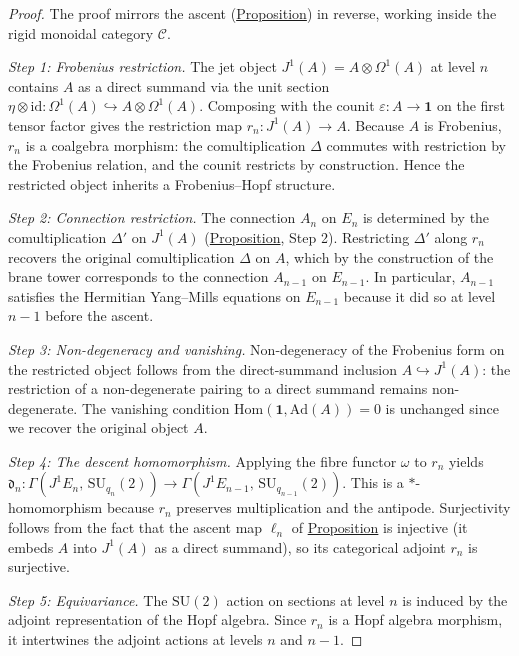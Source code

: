 \begin{proof}
The proof mirrors the ascent (\hyperref[prop:jet-prolongation]{Proposition}) in
reverse, working inside the rigid monoidal category $\mathcal{C}$.

\emph{Step 1: Frobenius restriction.}
The jet object $J^1(A) = A \otimes \Omega^1(A)$ at level $n$ contains $A$
as a direct summand via the unit section
$\eta \otimes \mathrm{id}\colon \Omega^1(A) \hookrightarrow A \otimes
\Omega^1(A)$.  Composing with the counit $\varepsilon\colon A \to \mathbf{1}$
on the first tensor factor gives the restriction map
$r_n\colon J^1(A) \to A$.  Because $A$ is Frobenius, $r_n$ is a coalgebra
morphism: the comultiplication $\Delta$ commutes with restriction by the
Frobenius relation, and the counit restricts by construction.  Hence the
restricted object inherits a Frobenius--Hopf structure.

\emph{Step 2: Connection restriction.}
The connection $A_n$ on $E_n$ is determined by the comultiplication
$\Delta'$ on $J^1(A)$ (\hyperref[prop:jet-prolongation]{Proposition}, Step 2).
Restricting $\Delta'$ along $r_n$ recovers the original comultiplication
$\Delta$ on $A$, which by the construction of the brane tower corresponds to
the connection $A_{n-1}$ on $E_{n-1}$.  In particular, $A_{n-1}$ satisfies
the Hermitian Yang--Mills equations on $E_{n-1}$ because it did so at level
$n{-}1$ before the ascent.

\emph{Step 3: Non-degeneracy and vanishing.}
Non-degeneracy of the Frobenius form on the restricted object follows from
the direct-summand inclusion $A \hookrightarrow J^1(A)$: the restriction of a
non-degenerate pairing to a direct summand remains non-degenerate.  The
vanishing condition $\mathrm{Hom}(\mathbf{1}, \mathrm{Ad}(A)) = 0$ is
unchanged since we recover the original object $A$.

\emph{Step 4: The descent homomorphism.}
Applying the fibre functor $\omega$ to $r_n$ yields
$\mathfrak{d}_n\colon
\Gamma(J^1 E_n,\, \mathrm{SU}_{q_n}(2)) \to
\Gamma(J^1 E_{n-1},\, \mathrm{SU}_{q_{n-1}}(2))$.
This is a $*$-homomorphism because $r_n$ preserves multiplication and
the antipode.  Surjectivity follows from the fact that the ascent map
$\ell_n$ of \hyperref[prop:jet-prolongation]{Proposition} is injective (it
embeds $A$ into $J^1(A)$ as a direct summand), so its categorical adjoint
$r_n$ is surjective.

\emph{Step 5: Equivariance.}
The $\mathrm{SU}(2)$ action on sections at level $n$ is induced by the
adjoint representation of the Hopf algebra.  Since $r_n$ is a Hopf algebra
morphism, it intertwines the adjoint actions at levels $n$ and $n{-}1$.
\end{proof}

